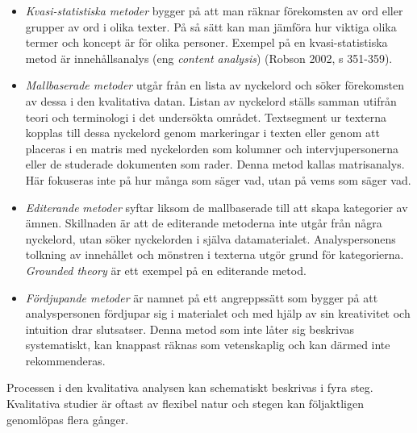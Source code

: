 \begin{itemize}
\item
  \emph{Kvasi-statistiska} \emph{metoder} bygger på att man räknar
  förekomsten av ord eller grupper av ord i olika texter. På så sätt kan
  man jämföra hur viktiga olika termer och koncept är för olika
  personer. Exempel på en kvasi-statistiska metod är innehållsanalys
  (eng \emph{content analysis}) (Robson 2002, s 351-359).
\item
  \emph{Mallbaserade metoder} utgår från en lista av nyckelord och söker
  förekomsten av dessa i den kvalitativa datan. Listan av nyckelord
  ställs samman utifrån teori och terminologi i det undersökta området.
  Textsegment ur texterna kopplas till dessa nyckelord genom markeringar
  i texten eller genom att placeras i en matris med nyckelorden som
  kolumner och intervjupersonerna eller de studerade dokumenten som
  rader. Denna metod kallas matrisanalys. Här fokuseras inte på hur
  många som säger vad, utan på vems som säger vad.
\item
  \emph{Editerande} \emph{metoder} syftar liksom de mallbaserade till
  att skapa kategorier av ämnen. Skillnaden är att de editerande
  metoderna inte utgår från några nyckelord, utan söker nyckelorden i
  själva datamaterialet. Analyspersonens tolkning av innehållet och
  mönstren i texterna utgör grund för kategorierna. \emph{Grounded
  theory} är ett exempel på en editerande metod.
\item
  \emph{Fördjupande metoder} är namnet på ett angreppssätt som bygger på
  att analyspersonen fördjupar sig i materialet och med hjälp av sin
  kreativitet och intuition drar slutsatser. Denna metod som inte låter
  sig beskrivas systematiskt, kan knappast räknas som vetenskaplig och
  kan därmed inte rekommenderas.
\end{itemize}

Processen i den kvalitativa analysen kan schematiskt beskrivas i fyra
steg. Kvalitativa studier är oftast av flexibel natur och stegen kan
följaktligen genomlöpas flera gånger.

